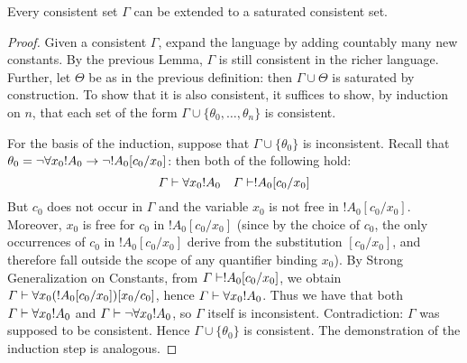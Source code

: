 \documentclass[open-logic-section]{subfiles}
\begin{document}
\begin{thm}
  Every consistent set $\Gamma$ can be extended to a saturated
  consistent set.
\end{thm}

\begin{proof}
Given a consistent $\Gamma$, expand the language by adding countably many new constants. By the previous Lemma, $\Gamma$ is still consistent in the richer language. Further, let $\Theta$ be as in the previous definition: then $\Gamma \cup \Theta$ is saturated by construction. To show that it is also consistent, it suffices to show, by induction on $n$, that each set of the form $\Gamma \cup \{ \theta_0, \dots, \theta_n \}$ is consistent.

For the basis of the induction, suppose that $\Gamma \cup \{ \theta_0 \}$ is inconsistent. Recall that $\theta_0 = \lnot \lforall[x_0] !A_0 \lif \lnot !A_0 [c_0/x_0]$: then both of the following hold:
\[
\Gamma \Proves \lforall[x_0] !A_0
\quad
\Gamma \Proves !A_0[c_0/x_0]
\]
But $c_0$ does not occur in $\Gamma$ and the variable $x_0$ is not free in $!A_0 [ c_0/x_0]$. Moreover, $x_0$ is free for $c_0$ in $!A_0 [c_0/x_0]$ (since by the choice of $c_0$, the only occurrences of $c_0$ in $!A_0 [c_0/x_0]$ derive from the substitution $[c_0/x_0]$, and therefore fall outside the scope of any quantifier binding $x_0$). By Strong Generalization on Constants, from $\Gamma \Proves !A_0 [c_0/x_0]$, we obtain $\Gamma \Proves \lforall[x_0] ( !A_0 [c_0/x_0] ) [x_0/c_0]$, hence $\Gamma \Proves \lforall[x_0] !A_0$. Thus we have that both $\Gamma \Proves \lforall[x_0] !A_0$ and $\Gamma \Proves \lnot \lforall[x_0] !A_0$, so $\Gamma$ itself is inconsistent. Contradiction: $\Gamma$ was supposed to be consistent. Hence $\Gamma \cup \{ \theta_0\}$ is consistent. The demonstration of the induction step is analogous.
\end{proof}
\end{document}
